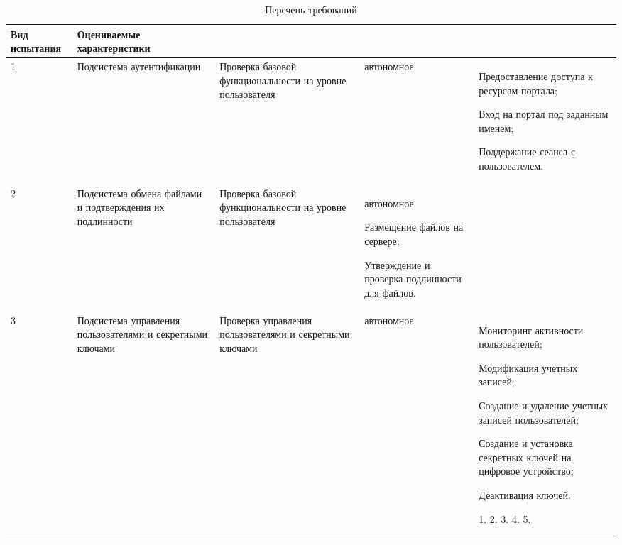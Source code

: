 \begin{longtable}[h!]{|p{0.5cm}|p{2.6cm}|p{4cm}|p{3cm}|p{5cm}|}
\caption[dfgdshfdfh]{Перечень требований}  \label{tab:4-2} \\ \hline
\small
\textbf{Вид испытания} & \textbf{Оцениваемые характеристики} \\ \hline

1 & Подсистема аутентификации &	Проверка базовой функциональности на уровне
пользователя & автономное & 
\vspace{-22pt}
\begin{list}{-}{\topsep=0pt\parskip=0pt\partopsep=0pt}
  \item Предоставление доступа к ресурсам портала;
  \item Вход на портал под заданным именем;
  \item Поддержание сеанса с пользователем.
\end{list}	\\ \hline

2 &	Подсистема обмена файлами и подтверждения их подлинности & Проверка базовой
функциональности на уровне пользователя & автономное
\vspace{-22pt}
\begin{list}{-}{\topsep=0pt\parskip=0pt\partopsep=0pt}
  \item Размещение файлов на
сервере;
  \item Утверждение и проверка подлинности для файлов.
\end{list} \\ \hline

3 & Подсистема управления пользователями и секретными ключами & Проверка
управления пользователями и секретными ключами & автономное	& 
\vspace{-22pt}
\begin{list}{-}{\topsep=0pt\parskip=0pt\partopsep=0pt}
  \item Мониторинг
активности пользователей;
  \item Модификация учетных записей;
  \item Создание и удаление учетных записей пользователей;
  \item Создание и установка секретных ключей на цифровое устройство;
  \item Деактивация ключей.
\end{list}
1.  2.  3. 
4. 
5. 

\end{longtable}